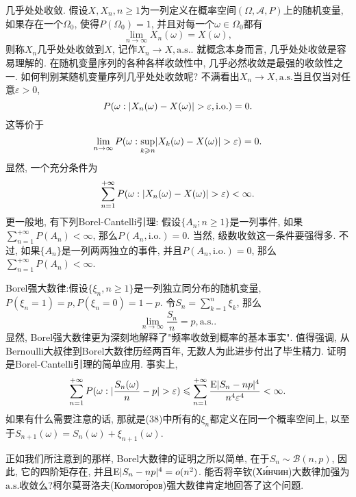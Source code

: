 几乎处处收敛. 假设$X,X_n,n\geqslant 1$为一列定义在概率空间$(\Omega,\mathscr{A},P)$上的随机变量, 如果存在一个$\Omega_0$, 使得$P(\Omega_0) = 1$, 并且对每一个$\omega\in\Omega_0$都有
\begin{equation}
\lim_{n\to\infty}X_n(\omega) = X(\omega),
\end{equation}
则称$X_n$几乎处处收敛到$X$, 记作$X_n\to X,\mathrm{a.s.}$. 就概念本身而言, 几乎处处收敛是容易理解的. 在随机变量序列的各种各样收敛性中, 几乎必然收敛是最强的收敛性之一. 如何判别某随机变量序列几乎处处收敛呢? 不满看出$X_n\to X,\mathrm{a.s.}$当且仅当对任意$\varepsilon>0$,
\begin{equation}
P(\omega:\lvert X_n(\omega)-X(\omega)\rvert>\varepsilon,\mathrm{i.o.}) = 0.
\end{equation}
这等价于\begin{equation}
\lim_{n\to\infty}P(\omega:\sup_{k\geqslant n}\lvert X_k(\omega)-X(\omega)\rvert>\varepsilon) = 0.
\end{equation}
显然, 一个充分条件为\begin{equation}
\sum_{n = 1}^{+\infty}P(\omega:\lvert X_n(\omega)-X(\omega)\rvert>\varepsilon)<\infty.
\end{equation}
更一般地, 有下列Borel-Cantelli引理: 假设$\{A_n;n\geqslant 1\}$是一列事件, 如果$\sum_{n =1}^{+\infty}P(A_n)<\infty$, 那么$P(A_n,\mathrm{i.o.}) = 0$. 当然, 级数收敛这一条件要强得多. 不过, 如果$\{A_n\}$是一列两两独立的事件, 并且$P(A_n,\mathrm{i.o.}) = 0$, 那么$\sum_{n = 1}^{+\infty}P(A_n)<\infty$.

Borel强大数律:假设$\{\xi_n,n\geqslant 1\}$是一列独立同分布的随机变量, $P(\xi_n = 1) = p,P(\xi_n = 0) =1-p$. 令$S_n = \sum_{k=1}^n\xi_k$, 那么\begin{equation}
\lim_{n\to\infty}\frac{S_n}{n} = p,\mathrm{a.s.}.
\end{equation}
显然, Borel强大数律更为深刻地解释了"频率收敛到概率的基本事实". 值得强调, 从Bernoulli大叔律到Borel大数律历经两百年, 无数人为此进步付出了毕生精力. 证明是Borel-Cantelli引理的简单应用. 事实上,
\begin{equation}
\sum_{n = 1}^{+\infty}P(\omega:\lvert\frac{S_n(\omega)}{n}-p\rvert>\varepsilon)\leqslant \sum_{n = 1}^{+\infty}\frac{\mathrm{E}\lvert S_n-np\rvert^4}{n^4\varepsilon^4}<\infty.
\end{equation}
如果有什么需要注意的话, 那就是(38)中所有的$\xi_n$都定义在同一个概率空间上, 以至于$S_{n+1}(\omega) = S_{n}(\omega)+\xi_{n+1}(\omega)$.

正如我们所注意到的那样, Borel大数律的证明之所以简单, 在于$S_n\sim\mathcal{B}(n,p)$, 因此, 它的四阶矩存在, 并且$\mathrm{E}\lvert S_n-np\rvert^4 = o(n^2)$. 能否将辛钦(Хи́нчин)大数律加强为$\mathrm{a.s.}$收敛么?柯尔莫哥洛夫(Колмого́ров)强大数律肯定地回答了这个问题.

